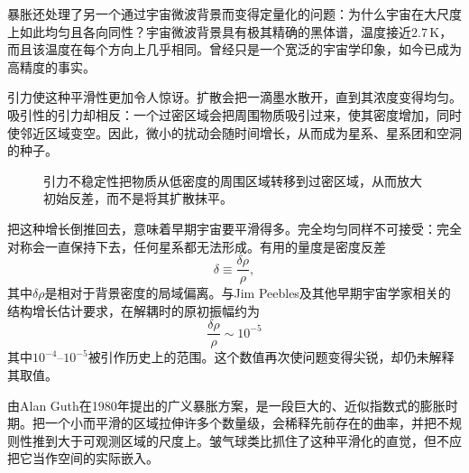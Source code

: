暴胀还处理了另一个通过宇宙微波背景而变得定量化的问题：为什么宇宙在大尺度上如此均匀且各向同性？宇宙微波背景具有极其精确的黑体谱，温度接近\(2.7\,\mathrm K\)，而且该温度在每个方向上几乎相同。曾经只是一个宽泛的宇宙学印象，如今已成为高精度的事实。

引力使这种平滑性更加令人惊讶。扩散会把一滴墨水散开，直到其浓度变得均匀。吸引性的引力却相反：一个过密区域会把周围物质吸引过来，使其密度增加，同时使邻近区域变空。因此，微小的扰动会随时间增长，从而成为星系、星系团和空洞的种子。

\begin{figure}[htbp]
\centering
\begin{coursefitfigure}
\end{coursefitfigure}
\caption{引力不稳定性把物质从低密度的周围区域转移到过密区域，从而放大初始反差，而不是将其扩散抹平。}
\label{fig:c08-gravity-growth}
\end{figure}

把这种增长倒推回去，意味着早期宇宙要平滑得多。完全均匀同样不可接受：完全对称会一直保持下去，任何星系都无法形成。有用的量度是密度反差
\begin{equation}
\delta\equiv\frac{\delta\rho}{\rho},
\end{equation}
其中\(\delta\rho\)是相对于背景密度的局域偏离。与Jim Peebles及其他早期宇宙学家相关的结构增长估计要求，在解耦时的原初振幅约为
\begin{equation}
\boxed{\frac{\delta\rho}{\rho}\sim10^{-5}}
\end{equation}
其中\(10^{-4}\)--\(10^{-5}\)被引作历史上的范围。这个数值再次使问题变得尖锐，却仍未解释其取值。

由Alan Guth在1980年提出的广义暴胀方案，是一段巨大的、近似指数式的膨胀时期。把一个小而平滑的区域拉伸许多个数量级，会稀释先前存在的曲率，并把不规则性推到大于可观测区域的尺度上。皱气球类比抓住了这种平滑化的直觉，但不应把它当作空间的实际嵌入。

\begin{classroomqa}
\end{classroomqa}

